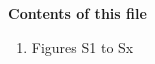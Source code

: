\documentclass[draft,gbc]{agutexSI2019}
\begin{document}
\begin{article}

%
%



\noindent\textbf{Contents of this file}
\begin{enumerate}
\item Figures S1 to Sx
\end{enumerate}



%









\end{article}
\end{document}
